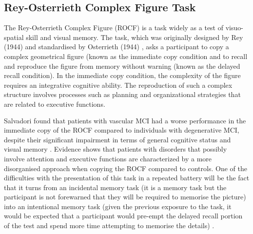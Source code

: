 \documentclass[10pt, letterpaper, twoside, openany]{book}
\begin{document}
\subsection{Rey-Osterrieth Complex Figure Task}
The Rey-Osterrieth Complex Figure (ROCF) is a task widely as a test of visuo-spatial skill and visual memory. The task, which was originally designed by Rey (1944) and standardised by Osterrieth (1944) \cite{Rey1941}, asks a participant to copy a complex geometrical figure (known as the immediate copy condition and to recall and reproduce the figure from memory without warning (known as the delayed recall condition). In the immediate copy condition, the complexity of the figure requires an integrative cognitive ability. The reproduction of such a complex structure involves processes such as planning and organizational strategies that are related to executive functions.
\par
Salvadori found that patients with vascular MCI had a worse performance in the immediate copy of the ROCF compared to individuals with degenerative MCI, despite their significant impairment in terms of general cognitive status and visual memory \cite{Salvadori2018}. Evidence shows that patients with disorders that possibly involve attention and executive functions are characterized by a more disorganised approach when copying the ROCF compared to controls. One of the difficulties with the presentation of this task in a repeated battery will be the fact that it turns from an incidental memory task (it is a memory task but the participant is not forewarned that they will be required to memorise the picture) into an intentional memory task (given the previous exposure to the task, it would be expected that a participant would pre-empt the delayed recall portion of the test and spend more time attempting to memorise the details) \cite{Teng2009}. 
\end{document}
